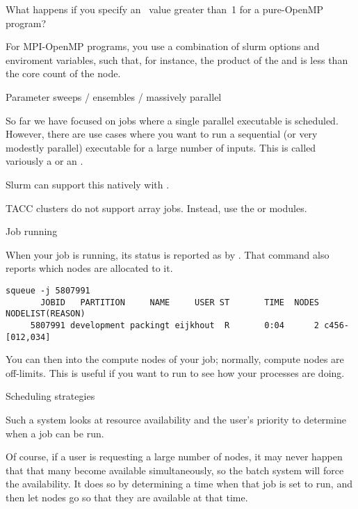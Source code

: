 \begin{exercise}
  What happens if you specify an~ value greater than~1
  for a pure-OpenMP program?
\end{exercise}

For  MPI-OpenMP programs, you use a combination
of slurm options and enviroment variables, such that, for instance,
the product of the  and  is less than the
core count of the node.

 {Parameter sweeps / ensembles / massively parallel}
\label{sec:slurm-sweep}

So far we have focused on jobs where a single parallel executable is scheduled.
However, there are use cases where you want to run a sequential (or very modestly parallel)
executable for a large number of inputs.
This is called variously a  or an .

Slurm can support this natively with .

\begin{taccnote}
  TACC clusters do not support array jobs.
  Instead, use the  or  modules.
\end{taccnote}

 {Job running}

When your job is running, its status is reported as  by .
That command also reports which nodes are allocated to it.

\begin{verbatim}
squeue -j 5807991
       JOBID   PARTITION     NAME     USER ST       TIME  NODES NODELIST(REASON)
     5807991 development packingt eijkhout  R       0:04      2 c456-[012,034]
\end{verbatim}

You can then  into the compute nodes of your job; 
normally, compute nodes are off-limits.
This is useful if you want to run 
to see how your processes are doing.

 {Scheduling strategies}
\label{sec:slurm-schedule}

Such a system looks at resource availability
and the user's priority to determine when a job can be run.

Of course, if a user is requesting a large number of nodes,
it may never happen that that many become available simultaneously,
so the batch system will force the availability.
It does so by determining a time when that job is
set to run, and then let nodes go 
so that they are available at that time.

